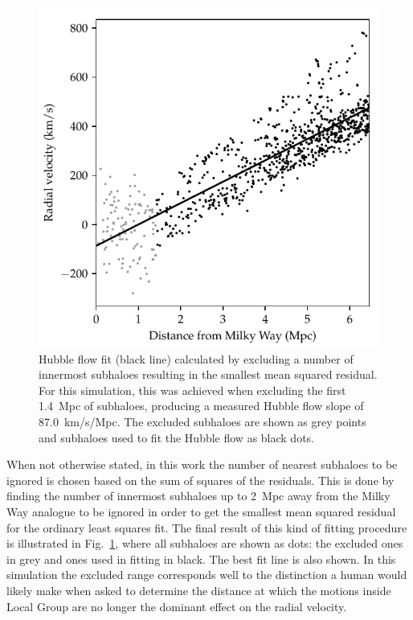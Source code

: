 \documentclass[english, twoside]{HYgradu}
\begin{document}
\begin{figure}
    \centering
    \includegraphics{kuvat/hubblefit.pdf}
    \caption{Hubble flow fit (black line) calculated by excluding a number of innermost subhaloes resulting in the smallest mean squared residual. For this simulation, this was achieved when excluding the first 1.4~Mpc of subhaloes, producing a measured Hubble flow slope of 87.0~km/s/Mpc. The excluded subhaloes are shown as grey points and subhaloes used to fit the Hubble flow as black dots.}\label{fig:hubblefit} %
\end{figure}

When not otherwise stated, in this work the number of nearest subhaloes to be ignored is chosen based on the sum of squares of the residuals. This is done by finding the number of innermost subhaloes up to 2~Mpc away from the Milky Way analogue to be ignored in order to get the smallest mean squared residual for the ordinary least squares fit. The final result of this kind of fitting procedure is illustrated in Fig.~\ref{fig:hubblefit}, where all subhaloes are shown as dots: the excluded ones in grey and ones used in fitting in black. The best fit line is also shown. In this simulation the excluded range corresponds well to the distinction a human would likely make when asked to determine the distance at which the motions inside Local Group are no longer the dominant effect on the radial velocity.
\end{document}
